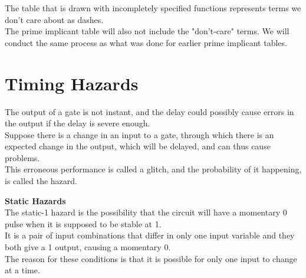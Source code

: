\documentclass[nobib]{tufte-handout}
\begin{document}
\begin{mdframed}
\begin{center}
    \end{center}
\end{mdframed}
The table that is drawn with incompletely specified functions represents terms we don't care about as dashes.\\
The prime implicant table will also not include the "don't-care" terms. We will conduct the same process as what was done for earlier prime implicant tables.\\
\section{Timing Hazards}
The output of a gate is not instant, and the delay could possibly cause errors
in the output if the delay is severe enough.\\ Suppose there is a change in an
input to a gate, through which there is an expected change in the output, which
will be delayed, and can thus cause problems.\\ This erroneous performance is
called a glitch, and the probability of it happening, is called the hazard.\\
\begin{mdframed}
    \textbf{Static Hazards}\\
    The static-1 hazard is the possibility that the circuit will have a momentary 0 pulse when it is supposed to be stable at 1.\\
    It is a pair of input combinations that differ in only one input variable and they both give a 1 output, causing a momentary 0.\\
    The reason for these conditions is that it is possible for only one input to change at a time.
\end{mdframed}
\end{document}
